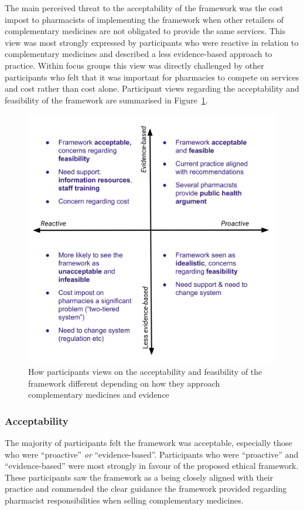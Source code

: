 \documentclass[11pt,a4paper]{article}
\begin{document}
The main perceived threat to the acceptability of the framework was the
cost impost to pharmacists of implementing the framework when other
retailers of complementary medicines are not obligated to provide the
same services. This view was most strongly expressed by participants who
were reactive in relation to complementary medicines and described a
less evidence-based approach to practice. Within focus groups this view
was directly challenged by other participants who felt that it was
important for pharmacies to compete on services and cost rather than
cost alone. Participant views regarding the acceptability and
feasibility of the framework are summarised in Figure~\ref{accfeas}.

\begin{figure}
\centering
\includegraphics{files/CMEthics_accfeas.png}
\caption{How participants views on the acceptability and feasibility of
the framework different depending on how they approach complementary
medicines and evidence \label{accfeas}}
\end{figure}

\subsubsection{Acceptability}\label{acceptability}

The majority of participants felt the framework was acceptable,
especially those who were ``proactive'' \emph{or} ``evidence-based''.
Participants who were ``proactive'' and ``evidence-based'' were most
strongly in favour of the proposed ethical framework. These participants
saw the framework as a being closely aligned with their practice and
commended the clear guidance the framework provided regarding pharmacist
responsibilities when selling complementary medicines.
\end{document}
